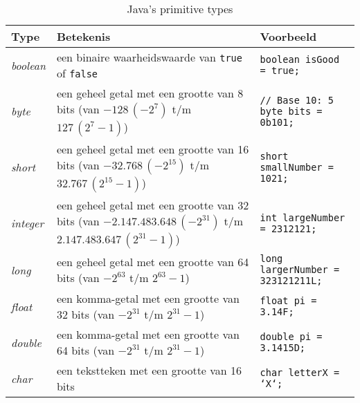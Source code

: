 \begin{table}[H]
    \centering
    \begin{tabularx}{\textwidth}{
        |>{\raggedright}l|>{\raggedright}X|>{\raggedright\arraybackslash}X|
    }
    \hline
    \textbf{Type} & \textbf{Betekenis} & \textbf{Voorbeeld} \\ \hline
        \textit{boolean}
        & een binaire waarheidswaarde van \texttt{true} of \texttt{false}
        & \texttt{boolean isGood = true;} \\ \hline
        \textit{byte}
        & een geheel getal met een grootte van 8 bits \newline 
        (van \(-128\, (-2^7)\) t/m \(127\, (2^7 - 1)\))
        & \texttt{// Base 10: 5} \newline \texttt{byte bits = 0b101;} \\ \hline
        \textit{short}
        & een geheel getal met een grootte van 16 bits \newline
        (van \(-32.768\, (-2^{15})\) t/m \(32.767\, (2^{15} - 1)\))
        & \texttt{short smallNumber = 1021;} \\ \hline
        \textit{integer}
        & een geheel getal met een grootte van 32 bits \newline
        (van \(-2.147.483.648\, (-2^{31})\) t/m \(2.147.483.647\, (2^{31} - 1)\))
        & \texttt{int largeNumber = 2312121;} \\ \hline
        \textit{long}
        & een geheel getal met een grootte van 64 bits \newline
        (van \(-2^{63}\) t/m \(2^{63} - 1\))
        & \texttt{long largerNumber = 323121211L;} \\ \hline
        \textit{float}
        & een komma-getal met een grootte van 32 bits \newline
        (van \(-2^{31}\) t/m \(2^{31} - 1\))
        & \texttt{float pi = 3.14F;} \\ \hline
        \textit{double}
        & een komma-getal met een grootte van 64 bits \newline
        (van \(-2^{31}\) t/m \(2^{31} - 1\))
        & \texttt{double pi = 3.1415D;} \\ \hline
        \textit{char}
        & een tekstteken met een grootte van 16 bits
        & \texttt{char letterX = `X`;} \\ \hline
    \end{tabularx}
    \caption{Java's primitive types}
    \label{table:primitive-types}
    \centering
\end{table}

